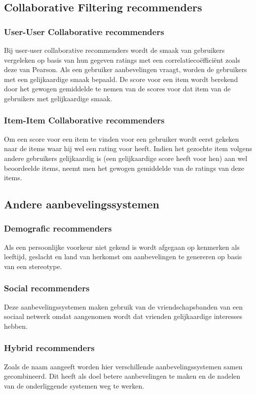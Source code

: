 \subsection{Collaborative Filtering recommenders}
\subsubsection{User-User Collaborative recommenders}
Bij user-user collaborative recommenders wordt de smaak van gebruikers vergeleken op basis van hun gegeven ratings met een  correlatieco\"effici\"ent zoals deze van Pearson. Als een gebruiker aanbevelingen vraagt, worden de gebruikers met een gelijkaardige smaak bepaald. De score voor een item wordt berekend door het gewogen gemiddelde te nemen van de scores voor dat item van de gebruikers met gelijkaardige smaak.
\subsubsection{Item-Item Collaborative recommenders}
Om een score voor een item te vinden voor een gebruiker wordt eerst gekeken naar de items waar hij wel een rating voor heeft. Indien het gezochte item volgens andere gebruikers gelijkaardig is (een gelijkaardige score heeft voor hen) aan wel beoordeelde items, neemt men het gewogen gemiddelde van de ratings van deze items.
\subsection{Andere aanbevelingssystemen}
\subsubsection{Demografic recommenders}
Als een persoonlijke voorkeur niet gekend is wordt afgegaan op kenmerken als leeftijd, geslacht en land van herkomst om aanbevelingen te genereren op basis van een stereotype.
\subsubsection{Social recommenders}
Deze aanbevelingssystemen maken gebruik van de vriendschapsbanden van een sociaal netwerk omdat aangenomen wordt dat vrienden gelijkaardige interesses hebben.
\subsubsection{Hybrid recommenders}
Zoals de naam aangeeft worden hier verschillende aanbevelingssystemen samen gecombineerd. Dit heeft als doel betere aanbevelingen te maken en de nadelen van de onderliggende systemen weg te werken.

